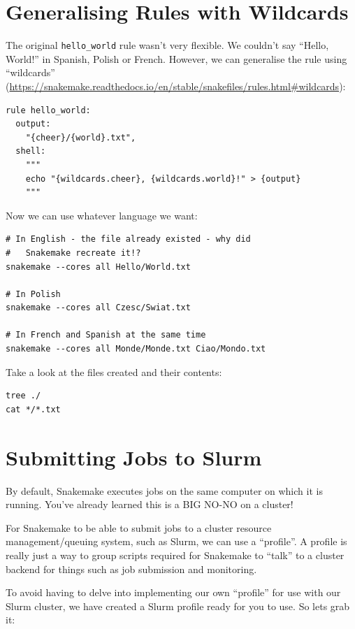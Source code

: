 \section{Generalising Rules with Wildcards}

The original \texttt{hello\_world} rule wasn't very flexible.
We couldn't say ``Hello, World!'' in Spanish, Polish or French.
However, we can generalise the rule using ``wildcards'' (\url{https://snakemake.readthedocs.io/en/stable/snakefiles/rules.html#wildcards}):

\begin{lstlisting}
rule hello_world:
  output:
    "{cheer}/{world}.txt",
  shell:
    """
    echo "{wildcards.cheer}, {wildcards.world}!" > {output}
    """
\end{lstlisting}

Now we can use whatever language we want:

\begin{lstlisting}
# In English - the file already existed - why did
#   Snakemake recreate it!?
snakemake --cores all Hello/World.txt

# In Polish
snakemake --cores all Czesc/Swiat.txt

# In French and Spanish at the same time
snakemake --cores all Monde/Monde.txt Ciao/Mondo.txt
\end{lstlisting}

Take a look at the files created and their contents:

\begin{lstlisting}
tree ./
cat */*.txt
\end{lstlisting}

\section{Submitting Jobs to Slurm}

By default, Snakemake executes jobs on the same computer on which it is running.
You've already learned this is a BIG NO-NO on a cluster!

For Snakemake to be able to submit jobs to a cluster resource management/queuing system, such as Slurm, we can use a ``profile''.
A profile is really just a way to group scripts required for Snakemake to ``talk'' to a cluster backend for things such as job submission and monitoring.

To avoid having to delve into implementing our own ``profile'' for use with our Slurm cluster, we have created a Slurm profile ready for you to use. So lets grab it:

